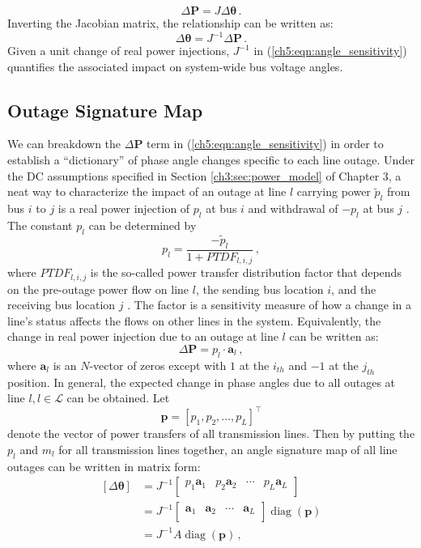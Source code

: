 $$
\Delta\textbf{P} = {J} \Delta\boldsymbol{\theta} \,.
$$
Inverting the Jacobian matrix, the relationship can be written as:
\begin{equation}
\label{ch5:eqn:angle_sensitivity}
\Delta\boldsymbol{\theta}  = {J}^{-1} \Delta\textbf{P} \,.
\end{equation}
Given a unit change of real power injections, ${J}^{-1}$ in (\ref{ch5:eqn:angle_sensitivity}) quantifies the associated impact on system-wide bus voltage angles. 

\subsection{Outage Signature Map}
We can breakdown the $\Delta\textbf{P}$ term in (\ref{ch5:eqn:angle_sensitivity}) in order to establish a ``dictionary'' of phase angle changes specific to each line outage. Under the DC assumptions specified in Section \ref{ch3:sec:power_model} of Chapter 3, a neat way to characterize the impact of an outage at line $l$ carrying power $\tilde{p}_l$ from bus $i$ to $j$ is a real power injection of $p_{l}$ at bus $i$ and withdrawal of $-p_{l}$ at bus $j$ \cite{wood2013power}. The constant $p_l$ can be determined by
$$
p_l = \frac{-\tilde{p}_l}{1+PTDF_{l, i, j}} \,,
$$ where $PTDF_{l, i, j}$ is the so-called power transfer distribution factor that depends on the pre-outage power flow on line $l$, the sending bus location $i$, and the receiving bus location $j$ \cite{liu2004role}. The factor is a sensitivity measure of how a change in a line’s status affects the flows on other lines in the system. Equivalently, the change in real power injection due to an outage at line $l$ can be written as:
$$
\Delta \textbf{P} = p_{l} \cdot \mathbf{a}_l \,,
$$ 
where $\mathbf{a}_l$ is an $N$-vector of zeros except with $1$ at the $i_{th}$ and $-1$ at the $j_{th}$ position. In general, the expected change in phase angles due to all outages at line $l, l \in \mathcal{L}$ can be obtained. Let 
$$
\boldsymbol{p} = [p_1, p_2, \dots, p_L]^{\top}
$$
denote the vector of power transfers of all transmission lines. Then by putting the $p_{l}$ and $m_l$ for all transmission lines together, an angle signature map of all line outages can be written in matrix form:
\begin{align}
\label{ch5:eqn:complete_map}
    [\Delta\boldsymbol{\theta}] 
    &= {J}^{-1} 
    \begin{bmatrix} p_{1} \mathbf{a}_{1} & p_{2} \mathbf{a}_{2} & \cdots & p_{L} \mathbf{a}_{L}\\ 
    \end{bmatrix} \nonumber\\ 
    &= {J}^{-1} 
    \begin{bmatrix} \mathbf{a}_{1} & \mathbf{a}_{2} & \cdots & \mathbf{a}_{L} \\
    \end{bmatrix} \operatorname{ diag}(\boldsymbol{p}) \nonumber\\
    &= {J}^{-1} A \operatorname{ diag}(\boldsymbol{p}) \,, 
\end{align}
